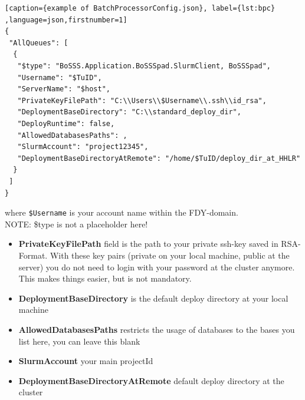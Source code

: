 \documentclass[11pt,twoside,a4paper]{fdyartcl}
\begin{document}
\noindent
\begin{minipage}{\linewidth}
\begin{lstlisting}[caption={example of BatchProcessorConfig.json}, label={lst:bpc} ,language=json,firstnumber=1]
{
 "AllQueues": [
  {
   "$type": "BoSSS.Application.BoSSSpad.SlurmClient, BoSSSpad",
   "Username": "$TuID",
   "ServerName": "$host",
   "PrivateKeyFilePath": "C:\\Users\\$Username\\.ssh\\id_rsa",
   "DeploymentBaseDirectory": "C:\\standard_deploy_dir",
   "DeployRuntime": false,
   "AllowedDatabasesPaths": ,
   "SlurmAccount": "project12345",
   "DeploymentBaseDirectoryAtRemote": "/home/$TuID/deploy_dir_at_HHLR"
  }
 ]
}
\end{lstlisting}
\end{minipage}
where \verb|$Username| is your account name within the FDY-domain.\\
NOTE: \$type is not a placeholder here!
\begin{itemize}
	\item[] \textbf{PrivateKeyFilePath} field is the path to your private ssh-key saved in RSA-Format.
	With these key pairs (private on your local machine, public at the server) you do not need to login with your password at the cluster anymore.
	This makes things easier, but is not mandatory. 
	\item[] \textbf{DeploymentBaseDirectory} is the default deploy directory at your local machine
	\item[] \textbf{AllowedDatabasesPaths} restricts the usage of databases to the bases you list here, you can leave this blank
	\item[] \textbf{SlurmAccount} your main projectId
	\item[] \textbf{DeploymentBaseDirectoryAtRemote} default deploy directory at the cluster
\end{itemize}
\end{document}
